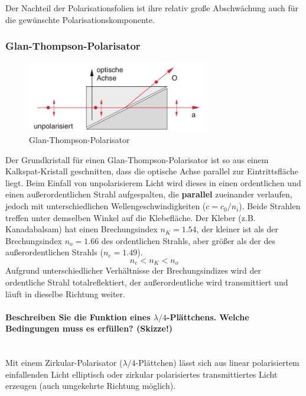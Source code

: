 \documentclass[a4paper, 11pt, ngerman, parskip=half-]{scrartcl}
\begin{document}
Der Nachteil der Polarisationsfolien ist ihre relativ große Abschwächung auch für die gewünschte Polarisationskomponente.
%
\subsubsection*{Glan-Thompson-Polarisator}
%
\begin{figure}[H]
    \centering
    \begin{samepage}
        \includegraphics[width=0.7\textwidth]{image/15/Glan-Thompson.jpg}
        \caption{Glan-Thompson-Polarisator}
        \label{fig:Glan-Thompson-Polarisator}
    \end{samepage}
\end{figure}
%
Der Grundkristall für einen Glan-Thompson-Polarisator ist so aus einem Kalkspat-Kristall geschnitten, dass die optische Achse parallel zur Eintrittsfläche liegt. Beim Einfall von unpolarisierem Licht wird dieses in einen ordentlichen und einen außerordentlichen Strahl aufgespalten, die \textbf{parallel} zueinander verlaufen, jedoch mit unterschiedlichen Wellengeschwindigkeiten ($c = c_0 / n_i$). Beide Strahlen treffen unter demselben Winkel auf die Klebefläche.
Der Kleber (z.B. Kanadabalsam) hat einen Brechungsindex $n_K = \num{1.54}$, der kleiner ist als der Brechungsindex $n_o = \num{1.66}$ des
ordentlichen Strahls, aber größer als der des außerordentlichen Strahls ($n_e = \num{1.49}$).
%
\[n_e < n_K < n_o\]
%
Aufgrund unterschiedlicher Verhältnisse der Brechungsindizes wird der ordentliche Strahl totalreflektiert, der außerordentliche wird transmittiert und läuft in dieselbe Richtung weiter.
%
\paragraph{Beschreiben Sie die Funktion eines $\lambda/4$-Plättchens. Welche Bedingungen muss es erfüllen? (Skizze!)}~\\

Mit einem Zirkular-Polarisator ($\lambda/4$-Plättchen) lässt sich aus linear polarisiertem einfallenden Licht elliptisch oder zirkular polarisiertes transmittiertes Licht erzeugen (auch umgekehrte Richtung möglich).
\end{document}
